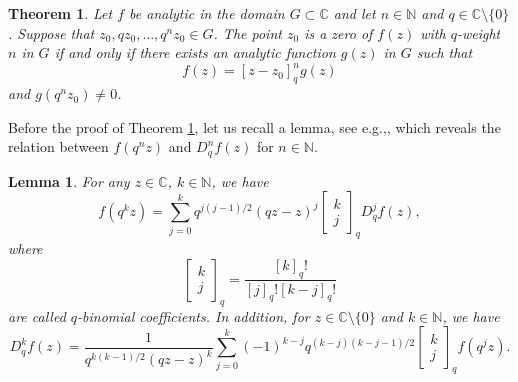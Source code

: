 \documentclass[a4paper,12pt]{article}
\newcommand{\C}{\mathbb{C}}
\newcommand{\N}{\mathbb{N}}
\newtheorem{theorem}[defin]{Theorem}
\newtheorem{lemma}[defin]{Lemma}
\numberwithin{equation}{section}
\begin{document}
\begin{theorem}\label{zero.theorem}
Let $f$ be analytic in the domain $G\subset\C$ and let $n\in\N$ and $q\in\C\setminus\{0\}$. Suppose that $z_0, qz_0,\ldots, q^nz_0\in G$.
The point $z_0$ is a zero of $f(z)$ with $q$-weight $n$ in $G$ if and only if there exists an analytic function $g(z)$ in $G$ such that
    \begin{equation}\label{fzero.eq}
    f(z)=[z-z_0]_q^ng(z)
    \end{equation}
and $g(q^nz_0)\neq 0$.
\end{theorem}

Before the proof of Theorem \ref{zero.theorem}, let us recall a lemma, see e.g.,\cite[Pages~12-13]{Bangerezako}, which reveals the relation between $f(q^nz)$ and $D_q^nf(z)$ for $n\in\N$.

\begin{lemma}\label{lm2}
	For any $z \in \mathbb{C}$, $k \in \mathbb{N}$, we have
    $$
	f(q^kz)=\sum_{j=0}^{k} q^{j(j-1)/2}(qz-z)^j
	\left[\begin{array}{cc}
	k\\j
	\end{array}\right]_q
	D_q^jf(z),
    $$
where
    $$
    \left[\begin{array}{cc}
    k\\
    j
    \end{array}
    \right]_q
    =\frac{[k]_q!}{[j]_q![k-j]_q!}
    $$
are called $q$-binomial coefficients. In addition, for $z \in\C\setminus\{0\}$ and $k\in\N$, we have
    $$
    D_q^kf(z) = \frac{1}{q^{k(k-1)/2}(qz-z)^k}\sum_{j=0}^k (-1)^{k-j}q^{(k-j)(k-j-1)/2}
    \left[\begin{array}{cc}
    k\\j
    \end{array}\right]_q
    f(q^jz).
    $$
\end{lemma}
\end{document}
